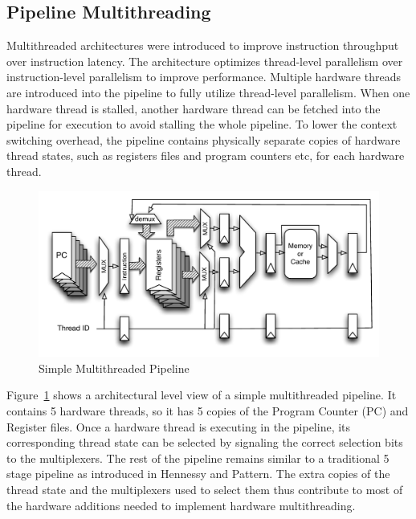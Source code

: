 \subsection{Pipeline Multithreading}
 Multithreaded architectures were introduced to improve instruction throughput over instruction latency.
The architecture optimizes thread-level parallelism over instruction-level parallelism to improve performance.
Multiple hardware threads are introduced into the pipeline to fully utilize thread-level parallelism. 
When one hardware thread is stalled, another hardware thread can be fetched into the pipeline for execution to avoid stalling the whole pipeline. 
To lower the context switching overhead, the pipeline contains physically separate copies of hardware thread states, such as registers files and program counters etc, for each hardware thread.
\begin{figure}
\begin{center}
\includegraphics[scale=.8]{figs/multithreaded_pipeline_block}
\end{center}
\vspace{-30pt}
\caption{Simple Multithreaded Pipeline}
\label{fig:multi-thread pipeline simplified}
\end{figure}
Figure~\ref{fig:multi-thread pipeline simplified} shows a architectural level view of a simple multithreaded pipeline.
It contains 5 hardware threads, so it has 5 copies of the Program Counter (PC) and Register files.
Once a hardware thread is executing in the pipeline, its corresponding thread state can be selected by signaling the correct selection bits to the multiplexers.
The rest of the pipeline remains similar to a traditional 5 stage pipeline as introduced in Hennessy and Pattern.   
The extra copies of the thread state and the multiplexers used to select them thus contribute to most of the hardware additions needed to implement hardware multithreading.

